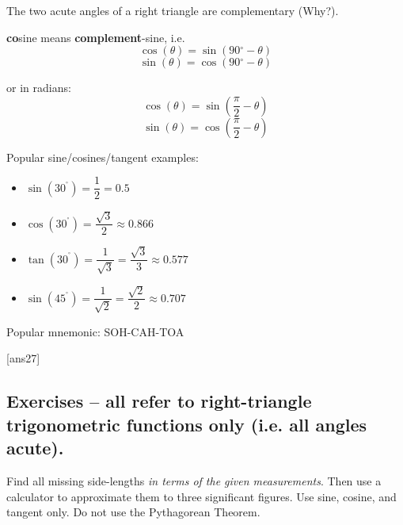 \documentclass{amsbook}
\numberwithin{section}{chapter}
\numberwithin{equation}{chapter}
\newcommand{\dg}{{^\circ}}
\begin{document}
\begin{multicols}{2}
The two acute angles of a right triangle are complementary (Why?).

\textbf{co}sine means \textbf{complement}-sine, i.e.
$$\cos(\theta) = \sin\left(90\dg-\theta\right)$$
$$\sin(\theta) = \cos\left(90\dg-\theta\right)$$

or in radians:
$$\cos(\theta) = \sin\left(\frac{\pi}{2}-\theta\right)$$
$$\sin(\theta) = \cos\left(\frac{\pi}{2}-\theta\right)$$

Popular sine/cosines/tangent examples:
\begin{itemize}
	\item $\sin\left (30^\dg \right) = \dfrac{1}{2} = 0.5$
	\item $\cos\left (30^\dg \right) = \dfrac{\sqrt{3}}{2} \approx 0.866$
	\item $\tan\left (30^\dg \right) = \dfrac{1}{\sqrt{3}} = \dfrac{\sqrt{3}}{3} \approx 0.577$
	\item $\sin\left (45^\dg \right) = \dfrac{1}{\sqrt{2}} = \dfrac{\sqrt{2}}{2} \approx 0.707$
\end{itemize}

Popular mnemonic: SOH-CAH-TOA
\end{multicols}



[ans27]
\subsection*{Exercises -- all refer to right-triangle trigonometric functions only (i.e. all angles acute).} \hfill

Find all missing side-lengths \textit{in terms of the given measurements}. Then use a calculator to approximate them to three significant figures. Use sine, cosine, and tangent only. Do not use the Pythagorean Theorem.
\end{document}
